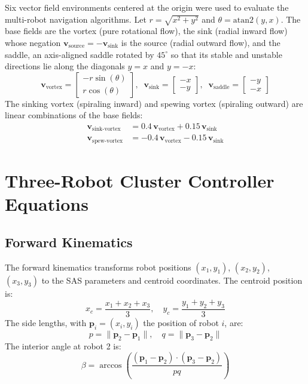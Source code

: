 \documentclass[lettersize,journal]{IEEEtran}
\begin{document}
Six vector field environments centered at the origin were used to evaluate the multi-robot navigation algorithms. Let $r = \sqrt{x^2 + y^2}$ and $\theta = \text{atan2}(y, x)$. The base fields are the vortex (pure rotational flow), the sink (radial inward flow) whose negation $\mathbf{v}_{\text{source}} = -\mathbf{v}_{\text{sink}}$ is the source (radial outward flow), and the saddle, an axis-aligned saddle rotated by $45^\circ$ so that its stable and unstable directions lie along the diagonals $y = x$ and $y = -x$:
\begin{equation}\label{eq:14}
\mathbf{v}_{\text{vortex}} = \begin{bmatrix} -r \sin(\theta) \\ r \cos(\theta) \end{bmatrix}, \;\;
\mathbf{v}_{\text{sink}} = \begin{bmatrix} -x \\ -y \end{bmatrix}, \;\;
\mathbf{v}_{\text{saddle}} = \begin{bmatrix} -y \\ -x \end{bmatrix}
\end{equation}
The sinking vortex (spiraling inward) and spewing vortex (spiraling outward) are linear combinations of the base fields:
\begin{equation}\label{eq:15}
\begin{aligned}
\mathbf{v}_{\text{sink-vortex}} &= 0.4\,\mathbf{v}_{\text{vortex}} + 0.15\,\mathbf{v}_{\text{sink}} \\
\mathbf{v}_{\text{spew-vortex}} &= -0.4\,\mathbf{v}_{\text{vortex}} - 0.15\,\mathbf{v}_{\text{sink}}
\end{aligned}
\end{equation}

\section{Three-Robot Cluster Controller Equations}

\subsection{Forward Kinematics}

The forward kinematics transforms robot positions $(x_1, y_1)$, $(x_2, y_2)$, $(x_3, y_3)$ to the SAS parameters and centroid coordinates. The centroid position is:
\begin{equation}\label{eq:20}
x_c = \frac{x_1 + x_2 + x_3}{3}, \quad y_c = \frac{y_1 + y_2 + y_3}{3}
\end{equation}
The side lengths, with $\mathbf{p}_i = (x_i, y_i)$ the position of robot $i$, are:
\begin{equation}\label{eq:21}
p = \lVert \mathbf{p}_2 - \mathbf{p}_1 \rVert, \quad q = \lVert \mathbf{p}_3 - \mathbf{p}_2 \rVert
\end{equation}
The interior angle at robot 2 is:
\begin{equation}\label{eq:23}
\beta = \arccos\left(\frac{(\mathbf{p}_1 - \mathbf{p}_2) \cdot (\mathbf{p}_3 - \mathbf{p}_2)}{pq}\right)
\end{equation}
\end{document}
